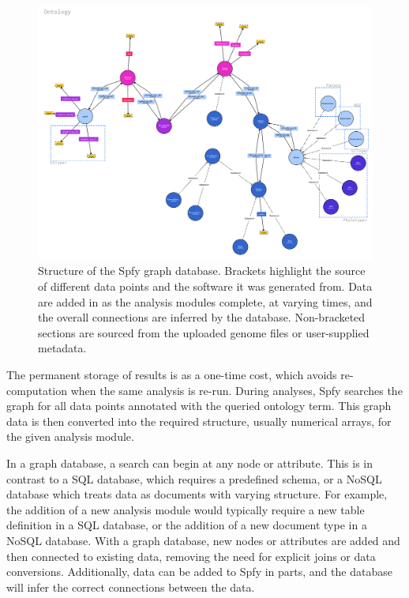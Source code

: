 \documentclass{article}
\begin{document}
\begin{figure}[!hb]
\begin{center}
\includegraphics[width=\textwidth]{images/ontology}
\end{center}
\caption{Structure of the Spfy graph database. Brackets highlight the source of different data points and the software it was generated from. Data are added in as the analysis modules complete, at varying times, and the overall connections are inferred by the database. Non-bracketed sections are sourced from the uploaded genome files or user-supplied metadata.}
\label{fig-ontology}
\end{figure}

The permanent storage of results is as a one-time cost, which avoids re-computation when the same analysis is re-run. During analyses, Spfy searches the graph for all data points annotated with the queried ontology term. This graph data is then converted into the required structure, usually numerical arrays, for the given analysis module.

In a graph database, a search can begin at any node or attribute. This is in contrast to a SQL database, which requires a predefined schema, or a NoSQL database which treats data as documents with varying structure.
For example, the addition of a new analysis module would typically require a new table definition in a SQL database, or the addition of a new document type in a NoSQL database. With a graph database, new nodes or attributes are added and then connected to existing data, removing the need for explicit joins or data conversions. Additionally, data can be added to Spfy in parts, and the database will infer the correct connections between the data.
\end{document}
